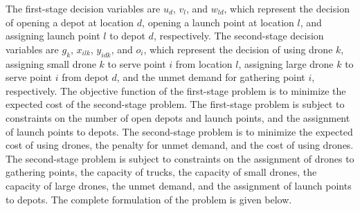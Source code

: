 \documentclass[preprint,review,11pt,authoryear]{elsarticle}
\begin{document}
The first-stage decision variables are $u_d$, $v_l$, and $w_{ld}$, which represent the decision of opening a depot at location $d$, opening a launch point at location $l$, and assigning launch point $l$ to depot $d$, respectively. The second-stage decision variables are $g_k$, $x_{ilk}$, $y_{idk}$, and $o_i$, which represent the decision of using drone $k$, assigning small drone $k$ to serve point $i$ from location $l$, assigning large drone $k$ to serve point $i$ from depot $d$, and the unmet demand for gathering point $i$, respectively. The objective function of the first-stage problem is to minimize the expected cost of the second-stage problem. The first-stage problem is subject to constraints on the number of open depots and launch points, and the assignment of launch points to depots. The second-stage problem is to minimize the expected cost of using drones, the penalty for unmet demand, and the cost of using drones. The second-stage problem is subject to constraints on the assignment of drones to gathering points, the capacity of trucks, the capacity of small drones, the capacity of large drones, the unmet demand, and the assignment of launch points to depots. The complete formulation of the problem is given below.
\end{document}
